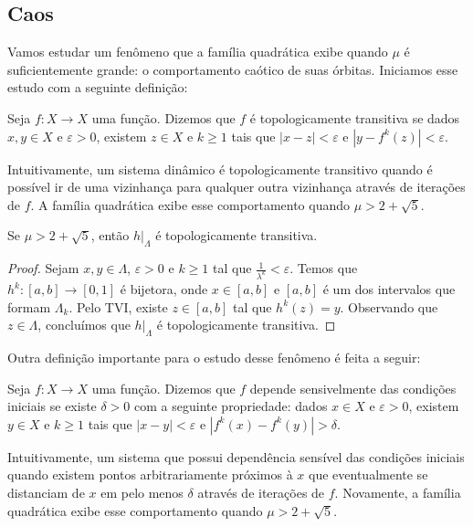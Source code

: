 \subsection{Caos}

Vamos estudar um fenômeno que a família quadrática exibe quando $\mu$ é suficientemente grande: o comportamento caótico de suas órbitas.
Iniciamos esse estudo com a seguinte definição:

\begin{definition}
Seja $f: X \to X$ uma função. Dizemos que $f$ é topologicamente transitiva se dados $x, y \in X$ e $\varepsilon > 0$,  existem $z \in X$ e $k \geq 1$ tais que $|x - z| < \varepsilon$ e $|y - f^k(z)| < \varepsilon$.
\end{definition} 

Intuitivamente, um sistema dinâmico é topologicamente transitivo quando é possível ir de uma vizinhança para qualquer outra vizinhança através de iterações de $f$. A família quadrática exibe esse comportamento quando $\mu > 2 + \sqrt{5}$.

\begin{proposition}
Se $\mu > 2 + \sqrt{5}$, então $h|_\Lambda$ é topologicamente transitiva.
\end{proposition}

\begin{proof}
Sejam $x, y \in \Lambda$, $\varepsilon > 0$ e $k \geq 1$ tal que $\frac{1}{\lambda^k} < \varepsilon$.
Temos que $h^k: [a, b] \to [0, 1]$ é bijetora, onde $x \in [a, b]$ e $[a, b]$ é um dos intervalos que formam $\Lambda_k$. Pelo TVI, existe $z \in [a, b]$ tal que $h^k(z) = y$. Observando que $z \in \Lambda$, concluímos que $h|_\Lambda$ é topologicamente transitiva.
\end{proof}

Outra definição importante para o estudo desse fenômeno é feita a seguir:

\begin{definition}
Seja $f: X \to X$ uma função. Dizemos que $f$ depende sensivelmente das condições iniciais se existe $\delta > 0$ com a seguinte propriedade: dados $x \in X$ e $\varepsilon > 0$, existem $y \in X$ e $k \geq 1$ tais que $|x - y| < \varepsilon$ e $|f^k(x) - f^k(y)| > \delta$.
\end{definition}

Intuitivamente, um sistema que possui dependência sensível das condições iniciais quando existem pontos arbitrariamente próximos à $x$ que eventualmente se distanciam de $x$ em pelo menos $\delta$ através de iterações de $f$. Novamente, a família quadrática exibe esse comportamento quando $\mu > 2 + \sqrt{5}$.

